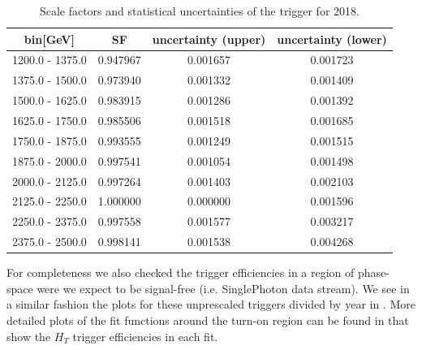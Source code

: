 \begin{table}
	\centering
	\caption{Scale factors and statistical uncertainties of the \HT trigger for 2018.}
	\label{tab:2018_triggerSF}
	\begin{tabular}{cccc}
		\hline
		\HT bin[GeV]    & SF       & uncertainty (upper) & uncertainty (lower) \\
		\hline
		1200.0 - 1375.0 & 0.947967 & 0.001657            & 0.001723            \\
		1375.0 - 1500.0 & 0.973940 & 0.001332            & 0.001409            \\
		1500.0 - 1625.0 & 0.983915 & 0.001286            & 0.001392            \\
		1625.0 - 1750.0 & 0.985506 & 0.001518            & 0.001685            \\
		1750.0 - 1875.0 & 0.993555 & 0.001249            & 0.001515            \\
		1875.0 - 2000.0 & 0.997541 & 0.001054            & 0.001498            \\
		2000.0 - 2125.0 & 0.997264 & 0.001403            & 0.002103            \\
		2125.0 - 2250.0 & 1.000000 & 0.000000            & 0.001596            \\
		2250.0 - 2375.0 & 0.997558 & 0.001577            & 0.003217            \\
		2375.0 - 2500.0 & 0.998141 & 0.001538            & 0.004268            \\
		\hline
	\end{tabular}
\end{table}

For completeness we also checked the trigger efficiencies in a region of phase-space were we expect to be signal-free (i.e. SinglePhoton data stream). We see in a similar fashion the plots for these unprescaled triggers divided by year in .
More detailed plots of the fit functions around the turn-on region can be found in 
that show the $H_T$ trigger efficiencies in each fit.



